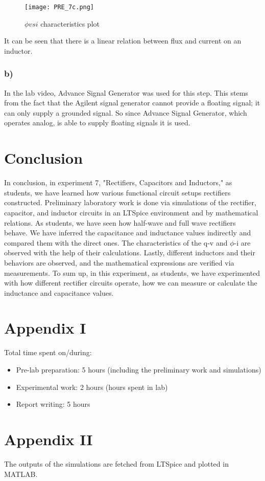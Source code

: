 \documentclass[letterpaper,12pt]{article}
\begin{document}
\begin{figure}[H]
	\centering
   \texttt{[image: PRE\_7c.png]}
   \caption{\(\phi vs i\) characteristics plot}
\end{figure}
It can be seen that there is a linear relation between flux and current on an inductor.
\subsubsection{b)}
In the lab video, Advance Signal Generator was used for this step. This stems from the fact that the Agilent signal generator cannot provide a floating signal; it can only supply a grounded signal. So since Advance Signal Generator, which operates analog, is able to supply floating signals it is used. 
\section{Conclusion}

In conclusion, in experiment 7, "Rectifiers, Capacitors and Inductors," as students, we have learned how various functional circuit setups rectifiers constructed. Preliminary laboratory work is done via simulations of the rectifier, capacitor, and inductor circuits in an LTSpice environment and by mathematical relations. As students, we have seen how half-wave and full wave rectifiers behave. We have inferred the capacitance and inductance values indirectly and compared them with the direct ones. The characteristics of the q-v and \(\phi\)-i are observed with the help of their calculations. Lastly, different inductors and their behaviors are observed, and the mathematical expressions are verified via measurements. To sum up, in this experiment, as students, we have experimented with how different rectifier circuits operate, how we can measure or calculate the inductance and capacitance values. 
\section*{Appendix I}
Total time spent on/during:
\begin{itemize}
	\item Pre-lab preparation: 5 hours (including the preliminary work and simulations) 
	\item Experimental work: 2 hours (hours spent in lab)
	\item Report writing: 5 hours 
\end{itemize}
\section*{Appendix II}
The outputs of the simulations are fetched from LTSpice and plotted in MATLAB. 



\end{document}
